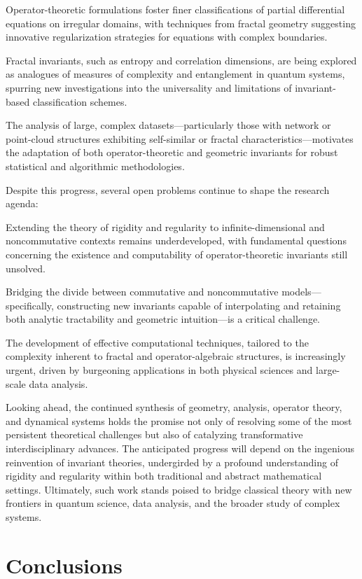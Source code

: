 \documentclass[sigconf]{acmart}
\begin{document}
Operator-theoretic formulations foster finer classifications of partial differential equations on irregular domains, with techniques from fractal geometry suggesting innovative regularization strategies for equations with complex boundaries.

Fractal invariants, such as entropy and correlation dimensions, are being explored as analogues of measures of complexity and entanglement in quantum systems, spurring new investigations into the universality and limitations of invariant-based classification schemes.

The analysis of large, complex datasets—particularly those with network or point-cloud structures exhibiting self-similar or fractal characteristics—motivates the adaptation of both operator-theoretic and geometric invariants for robust statistical and algorithmic methodologies.

Despite this progress, several open problems continue to shape the research agenda:

Extending the theory of rigidity and regularity to infinite-dimensional and noncommutative contexts remains underdeveloped, with fundamental questions concerning the existence and computability of operator-theoretic invariants still unsolved.

Bridging the divide between commutative and noncommutative models—specifically, constructing new invariants capable of interpolating and retaining both analytic tractability and geometric intuition—is a critical challenge.

The development of effective computational techniques, tailored to the complexity inherent to fractal and operator-algebraic structures, is increasingly urgent, driven by burgeoning applications in both physical sciences and large-scale data analysis.

Looking ahead, the continued synthesis of geometry, analysis, operator theory, and dynamical systems holds the promise not only of resolving some of the most persistent theoretical challenges but also of catalyzing transformative interdisciplinary advances. The anticipated progress will depend on the ingenious reinvention of invariant theories, undergirded by a profound understanding of rigidity and regularity within both traditional and abstract mathematical settings. Ultimately, such work stands poised to bridge classical theory with new frontiers in quantum science, data analysis, and the broader study of complex systems.

\section{Conclusions}
\end{document}
